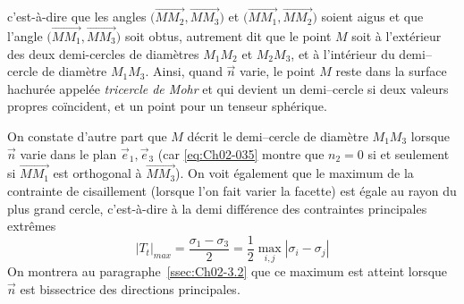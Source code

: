 c'est-à-dire que les angles $\bigl( \vec{MM_2},\vec{MM_3} \bigr)$ et  $\bigl( \vec{MM_1},\vec{MM_2} \bigr)$ soient aigus et que l'angle $\bigl( \vec{MM_1}, \vec{MM_3} \bigr)$ soit obtus, autrement dit que le point $M$ soit à l'extérieur des deux demi-cercles de diamètres $M_1M_2$ et $M_2M_3$, et à l'intérieur du demi--cercle de diamètre $M_1M_3$.
Ainsi, quand $\vec{n}$ varie, le point $M$ reste dans la surface hachurée appelée \emph{tricercle de Mohr} et qui devient un demi--cercle si deux valeurs propres coïncident, et un point pour un tenseur sphérique.

On constate d'autre part que $M$ décrit le demi--cercle de diamètre $M_1M_3$ lorsque $\vec{n}$ varie dans le plan $\vec{e}_1, \vec{e}_3$ (car \eqref{eq:Ch02-035} montre que $n_2 = 0$  si et seulement si $\vec{MM_1}$ est orthogonal à $\vec{MM_3}$).
On voit également que le maximum de la contrainte de cisaillement (lorsque l'on fait varier la facette) est égale au rayon du plus grand cercle, c'est-à-dire à la demi différence des contraintes principales extrêmes
\begin{equation}
    |T_t|_{max} = \frac{\sigma_1 - \sigma_3}{2} = \frac{1}{2} \max_{i,j} |\sigma_i - \sigma_j|
    \label{eq:Ch02-039}
\end{equation}
On montrera au paragraphe~\ref{ssec:Ch02-3.2} que ce maximum est atteint lorsque $\vec{n}$ est bissectrice des directions principales.  

